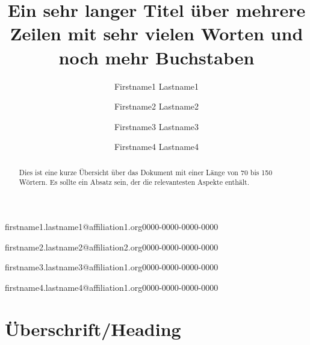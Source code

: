 \documentclass[]{lni}
\begin{document}
\title[Ein Kurztitel]{Ein sehr langer Titel über mehrere Zeilen mit sehr vielen
Worten und noch mehr Buchstaben}
 \author[1,2]{Firstname1 Lastname1}{firstname1.lastname1@affiliation1.org}{0000-0000-0000-0000}
 \author[2]{Firstname2 Lastname2}{firstname2.lastname2@affiliation2.org}{0000-0000-0000-0000}
 \author[3]{Firstname3 Lastname3}{firstname3.lastname3@affiliation1.org}{0000-0000-0000-0000}
 \author[1]{Firstname4 Lastname4}{firstname4.lastname4@affiliation1.org}{0000-0000-0000-0000}%
\maketitle

\begin{abstract}
Dies ist eine kurze Übersicht über das Dokument mit einer Länge von
70 bis 150 Wörtern. Es sollte ein Absatz sein, der die relevantesten
Aspekte enthält.
\end{abstract}
\section{Überschrift/Heading}

\end{document}
